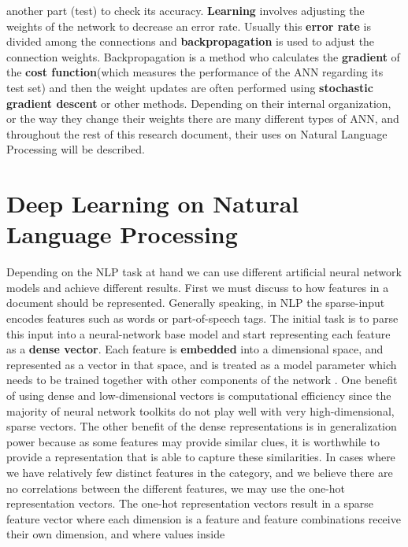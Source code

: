 \documentclass{scrartcl}
\begin{document}
    another part (test) to check its accuracy. 
    \textbf{Learning} involves adjusting the weights of the network 
    to decrease an error rate. Usually this \textbf{error rate} is divided among the connections and 
    \textbf{backpropagation} is used to adjust the connection weights. Backpropagation is a method
    who calculates the \textbf{gradient} of the \textbf{cost function}(which measures the performance
    of the ANN regarding its test set) and then the weight updates are often performed using
    \textbf{stochastic gradient descent} or other methods.
    Depending on their internal organization, or the way they change their weights there are many
    different types of ANN, and throughout the rest of this research document, their uses on
    Natural Language Processing will be described.
    \section{ Deep Learning on Natural Language Processing }
    Depending on the NLP task at hand we can use different artificial neural network models and
    achieve different results.
    First we must discuss to how features in a document should be represented. \newline
    Generally speaking, in NLP the sparse-input encodes features such as words
    or part-of-speech tags. The initial task is to parse this input into a neural-network
    base model and start representing each feature as a \textbf{dense vector}. 
    Each feature is \textbf{embedded} into a dimensional space, and represented as a vector in 
    that space, and is treated as a model parameter which needs to be trained together 
    with other components of the network \cite{nn-nlp}.
    One benefit of using dense and low-dimensional vectors is computational efficiency since
    the majority of neural network toolkits do not play well with very high-dimensional, sparse  
    vectors. The other benefit of the dense representations is in generalization power because 
    as some features may provide similar clues, it is worthwhile to provide a representation that
    is able to capture these similarities. \newline
    In cases where we have relatively few distinct features in the category, and we believe
    there are no correlations between the different features,
    we may use the one-hot representation vectors.
    The one-hot representation vectors result in a sparse feature vector where each dimension
    is a feature and feature combinations receive their own dimension, and where values inside
\end{document}
